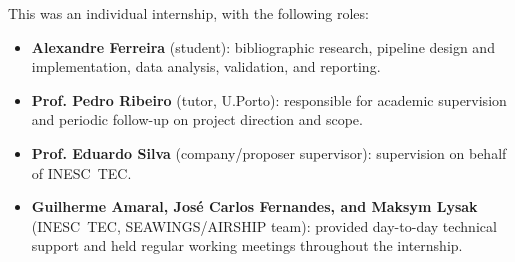 This was an individual internship, with the following roles:

\begin{itemize}
	\item \textbf{Alexandre Ferreira} (student): bibliographic research, pipeline design and implementation, data analysis, validation, and reporting.
	
	\item \textbf{Prof. Pedro Ribeiro} (tutor, U.Porto): responsible for academic supervision and periodic follow-up on project direction and scope.

	\item \textbf{Prof. Eduardo Silva} (company/proposer supervisor): supervision on behalf of INESC~TEC.
	
	\item \textbf{Guilherme Amaral, Jos\'{e} Carlos Fernandes, and Maksym Lysak} (INESC~TEC, SEAWINGS/AIRSHIP team): provided day-to-day technical support and held regular working meetings throughout the internship.
\end{itemize}
